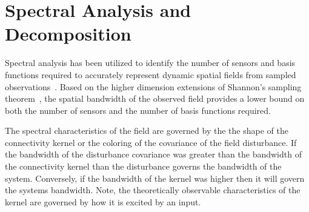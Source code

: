 \documentclass[12pt]{iopart}		%
\begin{document}
\section{Spectral Analysis and Decomposition}\label{SpectralAnalysisSection}
Spectral analysis has been utilized to identify the number of sensors and basis functions required to accurately represent dynamic spatial fields from sampled observations~\cite{Sanner1992,Scerri2009}. Based on the higher dimension extensions of Shannon's sampling theorem~\cite{Peterson1962}, the spatial bandwidth of the observed field provides a lower bound on both the number of sensors and the number of basis functions required.

The spectral characteristics of the field are governed by the the shape of the connectivity kernel or the coloring of the covariance of the field disturbance. If the bandwidth of the disturbance covariance was greater than the bandwidth of the connectivity kernel than the disturbance governs the bandwidth of the system. Conversely, if the bandwidth of the kernel was higher then it will govern the systems bandwidth. Note, the theoretically observable characteristics of the kernel are governed by how it is excited by an input.
 
\end{document}
